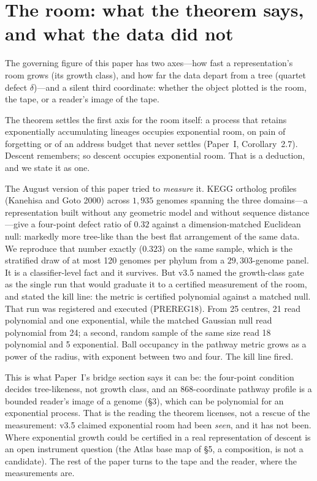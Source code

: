 \documentclass[11pt]{article}
\begin{document}
\section{The room: what the theorem says, and what the data did not}

The governing figure of this paper has two axes---how fast a representation's room grows (its growth class), and how far the data depart from a tree (quartet defect $\delta$)---and a silent third coordinate: whether the object plotted is the room, the tape, or a reader's image of the tape.

The theorem settles the first axis for the room itself: a process that retains exponentially accumulating lineages occupies exponential room, on pain of forgetting or of an address budget that never settles (Paper~I, Corollary~2.7). Descent remembers; so descent occupies exponential room. That is a deduction, and we state it as one.

The August version of this paper tried to \emph{measure} it. KEGG ortholog profiles (Kanehisa and Goto 2000) across $1{,}935$ genomes spanning the three domains---a representation built without any geometric model and without sequence distance---give a four-point defect ratio of $0.32$ against a dimension-matched Euclidean null: markedly more tree-like than the best flat arrangement of the same data. We reproduce that number exactly ($0.323$) on the same sample, which is the stratified draw of at most 120 genomes per phylum from a $29{,}303$-genome panel. It is a classifier-level fact and it survives. But v3.5 named the growth-class gate as the single run that would graduate it to a certified measurement of the room, and stated the kill line: the metric is certified polynomial against a matched null. That run was registered and executed (PREREG18). From 25 centres, 21 read polynomial and one exponential, while the matched Gaussian null read polynomial from 24; a second, random sample of the same size read 18 polynomial and 5 exponential. Ball occupancy in the pathway metric grows as a power of the radius, with exponent between two and four. The kill line fired.

This is what Paper~I's bridge section says it can be: the four-point condition decides tree-likeness, not growth class, and an $868$-coordinate pathway profile is a bounded reader's image of a genome (\S3), which can be polynomial for an exponential process. That is the reading the theorem licenses, not a rescue of the measurement: v3.5 claimed exponential room had been \emph{seen}, and it has not been. Where exponential growth could be certified in a real representation of descent is an open instrument question (the Atlas base map of \S5, a composition, is not a candidate). The rest of the paper turns to the tape and the reader, where the measurements are.
\end{document}
